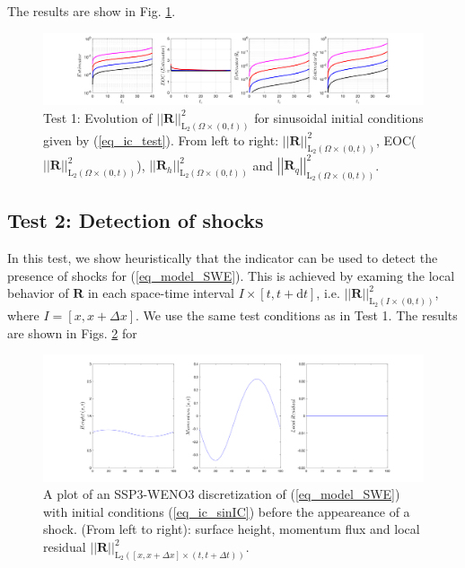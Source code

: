 \documentclass[12pt,a4paper]{article}
\numberwithin{equation}{section}
\theoremstyle{definition}
\newcommand{\Norm}[1]{\left|\left|#1\right|\right|}
\newcommand{\vect}[1]{\textbf{#1}}
\newcommand{\leb}{\text{L}}
\newcommand{\qp}[1]{\left(#1\right)}
\newcommand{\qb}[1]{\left[#1\right]}
\begin{document}
The results are show in Fig. \ref{fig_test_1_benchmark}.

\begin{figure}[h]
\centering
	\includegraphics[scale=0.45]{../figures/fig_SHW_RK3_WENO3_rec3_fixedplots_1x5_shw_periodic}	
	\caption{Test 1: Evolution of $\Norm{\vect{R}}^2_{\leb_2\qp{\Omega\times\qp{0,t}}}$ for sinusoidal initial conditions given by (\ref{eq_ic_test}).  From left to right: $\Norm{\vect{R}}^2_{\leb_2\qp{\Omega\times\qp{0,t}}}$, EOC($\Norm{\vect{R}}^2_{\leb_2\qp{\Omega\times\qp{0,t}}}$), $\Norm{\vect{R}_h}^2_{\leb_2\qp{\Omega\times\qp{0,t}}}$ and $\Norm{\vect{R}_q}^2_{\leb_2\qp{\Omega\times\qp{0,t}}}$.}
	\label{fig_test_1_benchmark}
\end{figure}
\subsection{Test 2: Detection of shocks}
In this test, we show heuristically that the indicator can be used to detect the presence of shocks for (\ref{eq_model_SWE}). This is achieved by examing the local behavior of $\vect{R}$ in each space-time interval $I \times \qb{t, t+\mathrm{d}t}$, i.e. $\Norm{\vect{R}}^2_{\leb_2\qp{I\times\qp{0,t}}}$, where $I=\qb{x, x+\Delta x}$.  We use the same test conditions as in Test 1.  The results are shown in 
Figs. \ref{fig_beforeshock} for 

\begin{figure}[H]
\centering
	\includegraphics[scale=0.45]{../figures/fig_SHW_RK3_WENO3_rec3_fixed_21_dtdx_1}	
	\caption{A plot of an SSP3-WENO3 discretization of (\ref{eq_model_SWE}) with initial conditions (\ref{eq_ic_sinIC}) before the appeareance of a shock. (From left to right): surface height, momentum flux and local residual $\Norm{\vect{R}}^2_{\leb_2\qp{\qb{x,x+\Delta x}\times\qp{t,t+\Delta t}}}$.}
	\label{fig_beforeshock}
\end{figure}
\end{document}
